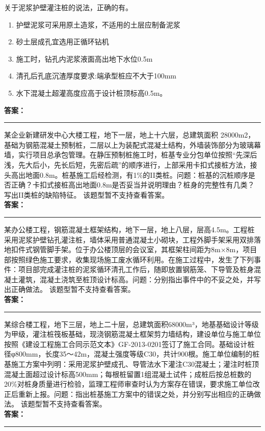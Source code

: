 \documentclass[UTF8,fontset=fandol,11pt]{ctexart}
\newcommand{\answerline}{\textcolor{answerred}{\rule{2.4cm}{0.7pt}}}
\begin{document}
\begin{quizbox}[title={第 11 题}]
关于泥浆护壁灌注桩的说法，正确的有。\\
\begin{enumerate}[label=\Alph*.]
\item 护壁泥浆可采用原土造浆，不适用的土层应制备泥浆
\item 砂土层成孔宜选用正循环钻机
\item 施工时，钻孔内泥浆液面高出地下水位0.5m
\item 清孔后孔底沉渣厚度要求:端承型桩应不大于100mm
\item 水下混凝土超灌高度应高于设计桩顶标高0.5m。
\end{enumerate}
\textbf{\textcolor{answerred}{答案：}} \answerline
\end{quizbox}

\begin{quizbox}[title={第 12 题}]
某企业新建研发中心大楼工程，地下一层，地上十六层，总建筑面积 28000m2，基础为钢筋混凝土预制桩，二层以上为装配式混凝土结构，外墙装饰部分为玻璃幕墙，实行项目总承包管理。在静压预制桩施工时，桩基专业分包单位按照“先深后浅，先大后小，先长后短，先密后疏”的顺序进行，上部采用卡扣式接桩方法，接头高出地面0.8m。桩基施工后经检测，有1\%的II类桩。问题：桩基的沉桩顺序是否正确？卡扣式接桩高出地面0.8m是否妥当并说明理由？桩身的完整性有几类？写出II类桩的缺陷特征。 该题型暂不支持查看答案。\\
\textbf{\textcolor{answerred}{答案：}} \answerline
\end{quizbox}

\begin{quizbox}[title={第 13 题}]
某办公楼工程，钢筋混凝土框架结构，地下一层，地上八层，层高4.5m。工程桩采用泥浆护壁钻孔灌注桩，墙体采用普通混凝土小砌块，工程外脚手架采用双排落地扣件式钢管脚手架。位于办公楼顶层的会议室，其框架柱间距为8m×8m，项目部按照绿色施工要求，收集现场施工废水循环利用。在施工过程中，发生了下列事件：项目部完成灌注桩的泥浆循环清孔工作后，随即放置钢筋笼、下导管及桩身混凝土灌筑，混凝土浇筑至桩顶设计标高。问题：分别指出事件中的不妥之处，并写出正确做法。 该题型暂不支持查看答案。\\
\textbf{\textcolor{answerred}{答案：}} \answerline
\end{quizbox}

\begin{quizbox}[title={第 14 题}]
某综合楼工程，地下三层，地上二十层，总建筑面积68000m³，地基基础设计等级为甲级，灌注桩筏板基础，现浇钢筋混凝土框架剪力墙结构，建设单位与施工单位按照《建设工程施工合同示范文本》GF-2013-0201签订了施工合同。基础设计桩径φ800mm，长度35～42m，混凝土强度等级C30，共计900根。施工单位编制的桩基施工方案中列明：采用泥浆护壁成孔、导管法水下灌注C30混凝土；灌注时桩顶混凝土面超过设计标高500mm；每根桩留置1组混凝土试件；成桩后按总桩数的20\%对桩身质量进行检验，监理工程师审查时认为方案存在错误，要求施工单位改正后重新上报。问题：指出桩基施工方案中的错误之处，并分别写出相应的正确做法。 该题型暂不支持查看答案。\\
\textbf{\textcolor{answerred}{答案：}} \answerline
\end{quizbox}
\end{document}
